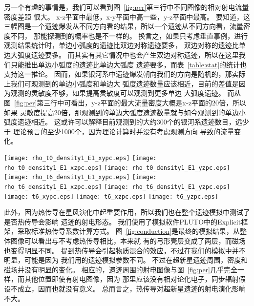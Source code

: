 另一个有趣的事情是，我们可以看到图~\ref{fig:per}第三行中不同图像的相对射电流量密度差距
很大。
x-z平面中最低，x-y平面中高一些，y-z平面中最高。
要知道，这三幅图是一个遗迹爆发从不同方向看的结果，所以一个遗迹从不同方向看，流量密度不同，
那能探测到的概率也是不一样的。
换言之，如果只考虑垂直事例，进行观测结果统计时，单边小弧度的遗迹比双边对称遗迹要多，
双边对称的遗迹比单边大弧度遗迹要多。
而其实有其它情况中也会产生双边对称遗迹，所以在这里我们只能推出单边小弧度的遗迹比单边大弧度
遗迹要多，而表~\ref{table:stat}的统计也支持这一推论。
因而，如果银河系中遗迹爆发朝向我们的方向是随机的，那实际上我们可观测到的单边小弧度和单边大
弧度遗迹数量应该相近，目前的差值是因为观测的灵敏度不够，如果提高灵敏度可以观测到更多单边
大弧度遗迹。
而从图~\ref{fig:per}第三行中可看出，y-z平面的最大流量密度大概是x-z平面的20倍，所以如果
灵敏度提高20倍，那观测到的单边大弧度遗迹数量就与如今观测到的单边小弧度遗迹相近。
这或许可以解释目前观测到的大约300个的银河系遗迹数目\citep{2014BASI...42...47G}，远少于
理论预言的至少1000个\citep{Frail1994a,Tammann1994}，因为理论计算时并没有考虑观测方向
导致的流量变化。

\begin{figure*}
    \centering
    \texttt{[image: rho\_t0\_density1\_E1\_xypc.eps]}
    \texttt{[image: rho\_t0\_density1\_E1\_xzpc.eps]}
    \texttt{[image: rho\_t0\_density1\_E1\_yzpc.eps]}\newline
    \texttt{[image: rho\_t6\_density1\_E1\_xypc.eps]}
    \texttt{[image: rho\_t6\_density1\_E1\_xzpc.eps]}
    \texttt{[image: rho\_t6\_density1\_E1\_yzpc.eps]}\newline
    \texttt{[image: t6\_xypc.eps]}
    \texttt{[image: t6\_xzpc.eps]}
    \texttt{[image: t6\_yzpc.eps]}\newline
    \caption{考虑热传导的模拟结果。这些结果对应了图~\ref{fig:per}的上面三列，唯一的不同
    就是考虑了热传导。}
\label{fig:conduction}
\end{figure*}

此外，因为热传导在星风演化中起重要作用，所以我们也在整个遗迹模拟中测试了是否热传导会影响
遗迹的射电形态。
我们使用了模拟软件PLUTO中的Explicit框架，采取标准热传导系数计算方式。
图~\ref{fig:conduction}是最终的模拟结果，从整体图像可以看出与不考虑热传导相比，本来就
有的弓形壳层变成了两层，而磁场也变得明显不同。
\citet{Meyer2015}提到热传导会引起物质混合的效应，不过在我们的模拟中并不明显，可能是因为
我们用的遗迹模拟参数不同。
不过在超新星遗迹周围，密度和磁场并没有明显的变化。
相应的，遗迹周围的射电图像与图~\ref{fig:per}几乎完全一样，而其他位置即使有射电图像，因为
那里应该没有相对论化电子，同步辐射假设不成立，因而也就没有意义。
总而言之，热传导对超新星遗迹的射电演化影响不大。

